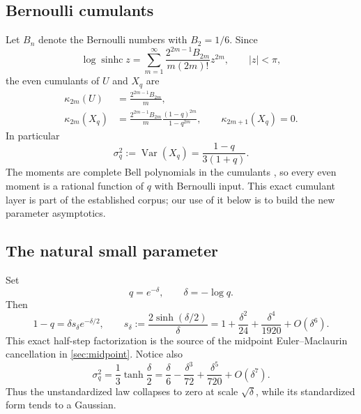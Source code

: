 \documentclass[11pt,a4paper]{article}
\theoremstyle{definition}
\newcommand{\Var}{\operatorname{Var}}
\newcommand{\sinhc}{\operatorname{sinhc}}
\newcommand{\1}{\mathbf{1}}
\begin{document}
\subsection{Bernoulli cumulants}

Let $B_n$ denote the Bernoulli numbers with $B_2=1/6$.  Since
\begin{equation}
 \log\sinhc z
 =\sum_{m=1}^{\infty}
   \frac{2^{2m-1}B_{2m}}{m(2m)!}z^{2m},
 \qquad |z|<\pi,
 \label{eq:logsinhc-series}
\end{equation}
the even cumulants of $U$ and $X_q$ are
\begin{align}
 \kappa_{2m}(U)&=\frac{2^{2m-1}B_{2m}}{m},
 \label{eq:uniform-cumulants}\\
 \kappa_{2m}(X_q)&=\frac{2^{2m-1}B_{2m}}{m}
     \frac{(1-q)^{2m}}{1-q^{2m}},
 \qquad \kappa_{2m+1}(X_q)=0.
 \label{eq:Xq-cumulants}
\end{align}
In particular
\begin{equation}
 \sigma_q^2:=\Var(X_q)=\frac{1-q}{3(1+q)}.
 \label{eq:variance}
\end{equation}
The moments are complete Bell polynomials in the cumulants \cite{Comtet}, so every even
moment is a rational function of $q$ with Bernoulli input.  This exact
cumulant layer is part of the established corpus; our use of it below is to
build the new parameter asymptotics.

\subsection{The natural small parameter}

Set
\begin{equation}
 q=e^{-\delta},\qquad \delta=-\log q.
 \label{eq:delta}
\end{equation}
Then
\begin{equation}
 1-q=\delta s_\delta e^{-\delta/2},
 \qquad
 s_\delta:=\frac{2\sinh(\delta/2)}{\delta}
 =1+\frac{\delta^2}{24}+\frac{\delta^4}{1920}+O(\delta^6).
 \label{eq:sdelta}
\end{equation}
This exact half-step factorization is the source of the midpoint
Euler--Maclaurin cancellation in \cref{sec:midpoint}.  Notice also
\begin{equation}
 \sigma_q^2=\frac13\tanh\frac{\delta}{2}
 =\frac{\delta}{6}-\frac{\delta^3}{72}
   +\frac{\delta^5}{720}+O(\delta^7).
 \label{eq:variance-delta}
\end{equation}
Thus the unstandardized law collapses to zero at scale $\sqrt\delta$, while
its standardized form tends to a Gaussian.
\end{document}

